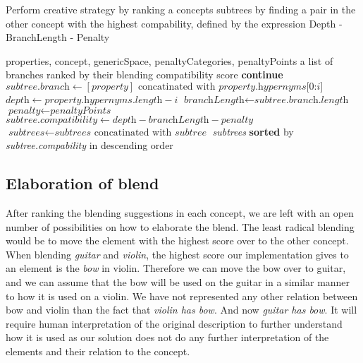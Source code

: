 \begin{algorithm}
	\caption{Perform creative strategy by ranking a concepts subtrees by finding a pair in the other concept with the highest compability, defined by the expression Depth - BranchLength - Penalty}\label{euclid}
	\begin{algorithmic}[1]
		\Require properties,
		concept,
		genericSpace,
		penaltyCategories,
		penaltyPoints
		\Ensure a list of branches ranked by their blending compatibility score
		\State \textbf{continue}
		\EndIf
		\EndIf
		\State ${\textit{subtree.branch} \gets {[\textit{property}] \text{ concatinated with } \textit{property.hypernyms[0:i]}}}$
		\State ${\textit{depth} \gets {\textit{property.hypernyms.length} - i}}$
		\State ${\textit{branchLength} \gets {\textit{subtree.branch.length}}}$
		\State ${\textit{penalty} \gets \textit{penaltyPoints}}$
		\EndIf
		\State ${\textit{subtree.compatibility} \gets {\textit{depth} - \textit{branchLength} - \textit{penalty}}}$
		\State ${\textit{subtrees} \gets {\textit{subtrees} \text{ concatinated with } \textit{subtree}}}$
		\EndFor
		\EndFor
		\State \Return \textit{subtrees} \textbf{sorted} by \textit{subtree.compability} in descending order
	\EndProcedure
\end{algorithmic}
\end{algorithm}

\subsection{Elaboration of blend}
After ranking the blending suggestions in each concept, we are left with an open number of possibilities on how to elaborate the blend. The least radical blending would be to move the element with the highest score over to the other concept. When blending \emph{guitar} and \emph{violin}, the highest score our implementation gives to an element is the \emph{bow} in violin. Therefore we can move the bow over to guitar, and we can assume that the bow will be used on the guitar in a similar manner to how it is used on a violin. We have not represented any other relation between bow and violin than the fact that \emph{violin has bow}. And now \emph{guitar has bow}. It will require human interpretation of the original description to further understand how it is used as our solution does not do any further interpretation of the elements and their relation to the concept.


